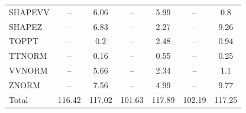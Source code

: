 \begin{table}[H]
\begin{center}
\begin{footnotesize}
\begin{tabular}{lcccccc}
				SHAPEVV & -- &  6.06 & -- &  5.99 & -- &  0.8 \\
				SHAPEZ & -- &  6.83 & -- &  2.27 & -- &  9.26 \\
				TOPPT & -- &  0.2 & -- &  2.48 & -- &  0.94 \\
				TTNORM & -- &  0.16 & -- &  0.55 & -- &  0.25 \\
				VVNORM & -- &  5.66 & -- &  2.34 & -- &  1.1 \\
				ZNORM & -- &  7.56 & -- &  4.99 & -- &  9.77 \\
				Total &  116.42  &  117.02 &  101.63  &  117.89 &  102.19  &  117.25 \\ \hline \hline
			\end{tabular}
			\label{tab:SysUncertainties_3500}
        \end{footnotesize}
	\end{center}
\end{table}


